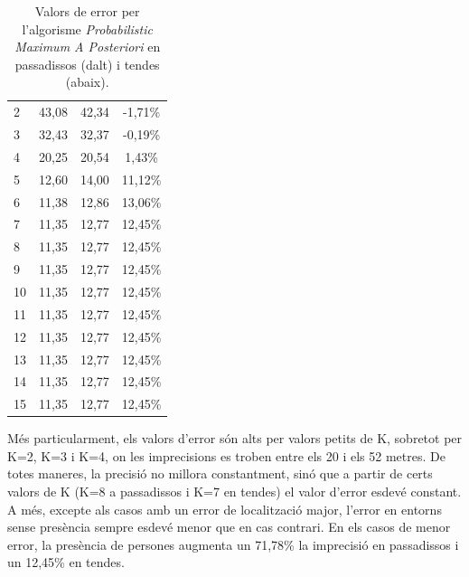\begin{table}[h]
\begin{center}
\begin{tabular}{|l|c|c|c|}
        2  & 43,08 & 42,34 & -1,71\% \\
        3  & 32,43 & 32,37 & -0,19\% \\
        4  & 20,25 & 20,54 & 1,43\%  \\
        5  & 12,60 & 14,00 & 11,12\% \\
        6  & 11,38 & 12,86 & 13,06\% \\
        7  & 11,35 & 12,77 & 12,45\% \\
        8  & 11,35 & 12,77 & 12,45\% \\
        9  & 11,35 & 12,77 & 12,45\% \\
        10 & 11,35 & 12,77 & 12,45\% \\
        11 & 11,35 & 12,77 & 12,45\% \\
        12 & 11,35 & 12,77 & 12,45\% \\
        13 & 11,35 & 12,77 & 12,45\% \\
        14 & 11,35 & 12,77 & 12,45\% \\
        15 & 11,35 & 12,77 & 12,45\% \\  \hline

      \end{tabular}
      
   \end{center}
\caption{Valors de error per l'algorisme \textit{Probabilistic Maximum A Posteriori} en passadissos (dalt) i tendes (abaix).}
\label{tab:error_MAP}
\end{table}

Més particularment, els valors d'error són alts per valors petits de K, sobretot per K=2, K=3 i K=4, on les imprecisions es troben entre els 20 i els 52 metres. De totes maneres, la precisió no millora constantment, sinó que a partir de certs valors de K (K=8 a passadissos i K=7 en tendes) el valor d'error esdevé constant. A més, excepte als casos amb un error de localització major, l'error en entorns sense presència sempre esdevé menor que en cas contrari. En els casos de menor error, la presència de persones augmenta un 71,78\% la imprecisió en passadissos i un 12,45\% en tendes.

